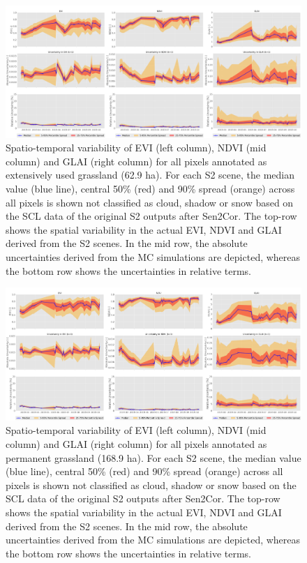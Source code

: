 \begin{figure}[H]
    \centering
    \includegraphics[width=\textwidth]{04-Uncertainty/img/Extensively Used Grasland_all-pixels-uncertainty-timeseries.png}
    \caption{Spatio-temporal variability of EVI (left column), NDVI (mid column) and GLAI (right column) for all pixels annotated as extensively used grassland (62.9 ha). For each S2 scene, the median value (blue line), central 50\% (red) and 90\% spread (orange) across all pixels is shown not classified as cloud, shadow or snow based on the SCL data of the original S2 outputs after Sen2Cor. The top-row shows the spatial variability in the actual EVI, NDVI and GLAI derived from the S2 scenes. In the mid row, the absolute uncertainties derived from the MC simulations are depicted, whereas the bottom row shows the uncertainties in relative terms.}
    \label{fig:ext-used-grassland-timeseries-and-uncertainty}
\end{figure}

\begin{figure}[H]
    \centering
    \includegraphics[width=\textwidth]{04-Uncertainty/img/Permament Grasland_all-pixels-uncertainty-timeseries.png}
    \caption{Spatio-temporal variability of EVI (left column), NDVI (mid column) and GLAI (right column) for all pixels annotated as permanent grassland (168.9 ha). For each S2 scene, the median value (blue line), central 50\% (red) and 90\% spread (orange) across all pixels is shown not classified as cloud, shadow or snow based on the SCL data of the original S2 outputs after Sen2Cor. The top-row shows the spatial variability in the actual EVI, NDVI and GLAI derived from the S2 scenes. In the mid row, the absolute uncertainties derived from the MC simulations are depicted, whereas the bottom row shows the uncertainties in relative terms.}
    \label{fig:permanent-grassland-timeseries-and-uncertainty}
\end{figure}

